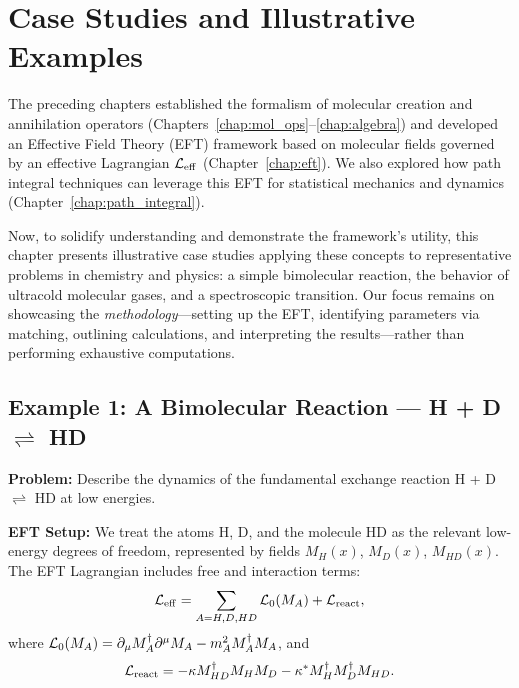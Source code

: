 
\chapter{Case Studies and Illustrative Examples}
\label{chap:examples}

The preceding chapters established the formalism of molecular creation and annihilation operators (Chapters~\ref{chap:mol_ops}--\ref{chap:algebra}) and developed an Effective Field Theory (EFT) framework based on molecular fields governed by an effective Lagrangian \(\mathcal{L}_{\mathrm{eff}}\) (Chapter~\ref{chap:eft}). We also explored how path integral techniques can leverage this EFT for statistical mechanics and dynamics (Chapter~\ref{chap:path_integral}).

Now, to solidify understanding and demonstrate the framework's utility, this chapter presents illustrative case studies applying these concepts to representative problems in chemistry and physics: a simple bimolecular reaction, the behavior of ultracold molecular gases, and a spectroscopic transition. Our focus remains on showcasing the \emph{methodology}---setting up the EFT, identifying parameters via matching, outlining calculations, and interpreting the results---rather than performing exhaustive computations.

\section{Example 1: A Bimolecular Reaction --- \texorpdfstring{H + D \(\rightleftharpoons\) HD}{H + D <=> HD}}
\label{sec:example_reaction}

\textbf{Problem:} Describe the dynamics of the fundamental exchange reaction H + D \(\rightleftharpoons\) HD at low energies.

\textbf{EFT Setup:} We treat the atoms H, D, and the molecule HD as the relevant low-energy degrees of freedom, represented by fields \(M_H(x)\), \(M_D(x)\), \(M_{HD}(x)\). The EFT Lagrangian includes free and interaction terms:
\begin{equation}
\mathcal{L}_{\mathrm{eff}} = \sum_{A=H,D,HD} \mathcal{L}_0(M_A) + \mathcal{L}_{\mathrm{react}},
\end{equation}
where \(\mathcal{L}_0(M_A) = \partial_\mu M^\dagger_A \partial^\mu M_A - m_A^2 M^\dagger_A M_A\), and
\begin{equation}
\mathcal{L}_{\mathrm{react}} = - \kappa M^\dagger_{HD} M_H M_D - \kappa^* M^\dagger_H M^\dagger_D M_{HD}.
\end{equation}

